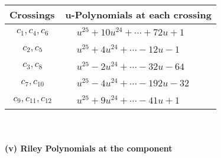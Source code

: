 \documentclass[1p]{elsarticle_modified}
\theoremstyle{definition}
\begin{document}
\begin{tabular}{m{50pt}|m{274pt}}
Crossings & \hspace{64pt}u-Polynomials at each crossing \\
\hline $$\begin{aligned}c_{1},c_{4},c_{6}\end{aligned}$$&$\begin{aligned}
&u^{25}+10 u^{24}+\cdots+72 u+1
\end{aligned}$\\
\hline $$\begin{aligned}c_{2},c_{5}\end{aligned}$$&$\begin{aligned}
&u^{25}+4 u^{24}+\cdots-12 u-1
\end{aligned}$\\
\hline $$\begin{aligned}c_{3},c_{8}\end{aligned}$$&$\begin{aligned}
&u^{25}-2 u^{24}+\cdots-32 u-64
\end{aligned}$\\
\hline $$\begin{aligned}c_{7},c_{10}\end{aligned}$$&$\begin{aligned}
&u^{25}-4 u^{24}+\cdots-192 u-32
\end{aligned}$\\
\hline $$\begin{aligned}c_{9},c_{11},c_{12}\end{aligned}$$&$\begin{aligned}
&u^{25}+9 u^{24}+\cdots-41 u+1
\end{aligned}$\\
\hline
\end{tabular}\\~\\
\newpage\renewcommand{\arraystretch}{1}
\flushleft \textbf{(v) Riley Polynomials at the component}\newline \\
\end{document}
